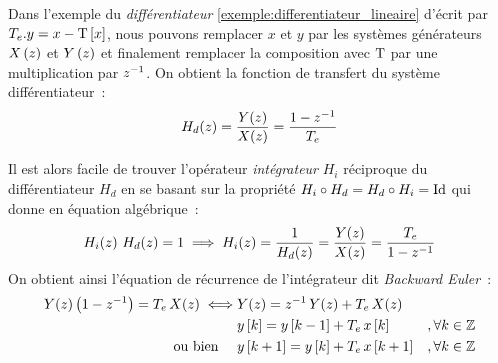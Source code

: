 \begin{exemple}
  \label{exemple:forward_euler}
  Dans l'exemple du \emph{différentiateur}
  \ref{exemple:differentiateur_lineaire} d'écrit par
  $T_e.y = x - \mathrm{T}\left[x\right]$, nous pouvons remplacer $x$ et $y$ par les
  systèmes générateurs $X\left(z\right)$ et $Y\left(z\right)$ et finalement remplacer la
  composition avec $\mathrm{T}$ par une multiplication par $z^{-1}$. On
  obtient la fonction de transfert du système différentiateur~:
  $$H_d\!\left(z\right)=\frac{Y\!\left(z\right)}{X\!\left(z\right)}= \frac{1-z^{-1}}{T_e}$$

  Il est alors facile de trouver l'opérateur \emph{intégrateur} $H_i$
  réciproque du différentiateur $H_d$ en se basant sur la propriété
  $H_i\circ H_d = H_d \circ H_i = \mathrm{Id}$ qui donne en équation
  algébrique~:
  $$
  H_i\!\left(z\right)\,H_d\!\left(z\right)=1 \implies H_i\!\left(z\right) = \frac{1}{H_d\!\left(z\right)} = \frac{Y\!\left(z\right)}{X\!\left(z\right)}=\frac{T_e}{1-z^{-1}}
  $$
  On obtient ainsi l'équation de récurrence de l'intégrateur dit \emph{Backward Euler}~:
  \begin{align}
    \label{eq:forward_euler}
    Y\!\left(z\right)\left(1-z^{-1}\right)=T_e\, X\!\left(z\right)  \iff & Y\!\left(z\right)=z^{-1}\,Y\!\left(z\right) + T_e\, X\!\left(z\right)&\nonumber\\
                                          &  y\left[k\right] = y\left[k-1\right] + T_e\, x\left[k\right] &, \forall k\in\mathbb{Z} \\
    \text{ou bien }   \quad                     &  y\left[k+1\right] = y\left[k\right] + T_e\, x\left[k+1\right] &, \forall k\in\mathbb{Z} \nonumber
  \end{align}
\end{exemple}

